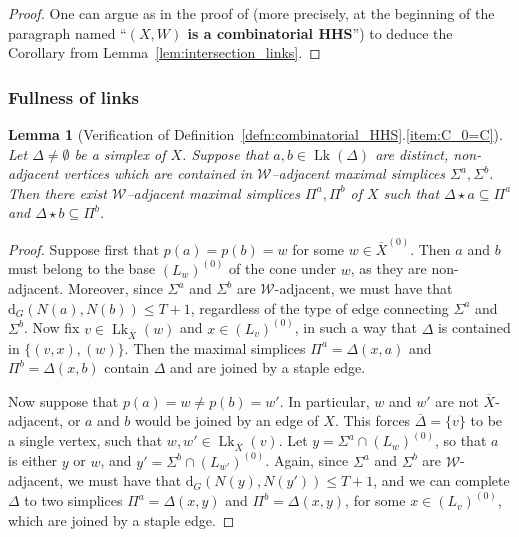 \documentclass[svgnames]{amsart}
\theoremstyle{plain}
\newtheorem{lemma}[thm]{Lemma}
\theoremstyle{definition}
\newcommand{\ov}[1]{\overline{#1}}
\newcommand{\dist}{\mathrm{d}}
\newcommand{\link}{\operatorname{Lk}}
\newcommand{\W}{\mathcal{W}}
\begin{document}
\begin{proof} 
One can argue as in the proof of \cite[Theorem 6.4]{BHMS} (more precisely, at the beginning of the paragraph named “\textbf{$(X,W)$ is a combinatorial HHS}”) to deduce the Corollary from Lemma~\ref{lem:intersection_links}.
\end{proof}






\subsubsection{Fullness of links}
\begin{lemma}[Verification of Definition~\ref{defn:combinatorial_HHS}.\eqref{item:C_0=C}]\label{lem:edges_in_link}
Let $\Delta\neq \emptyset$ be a simplex of $X$. Suppose that $a,b\in\link(\Delta)$ are distinct, non-adjacent vertices which are contained in $\W$--adjacent maximal simplices $\Sigma^a,\Sigma^b$. Then there exist $\W$--adjacent maximal simplices $\Pi^a,\Pi^b$ of $X$ such that $\Delta\star a\subseteq\Pi^a$ and $\Delta\star b\subseteq\Pi^b$.
\end{lemma}

\begin{proof}
    Suppose first that $p(a)=p(b)=w$ for some $w\in\ov{X}^{(0)}$. Then $a$ and $b$ must belong to the base $(L_w)^{(0)}$ of the cone under $w$, as they are non-adjacent. Moreover, since $\Sigma^a$ and $\Sigma^b$ are $\W$-adjacent, we must have that $\dist_{G}\left(N(a),N(b)\right)\le T+1$, regardless of the type of edge connecting $\Sigma^a$ and $\Sigma^b$. Now fix $v\in \link_{\ov X}(w)$ and $x\in (L_v)^{(0)}$, in such a way that $\Delta$ is contained in $\{(v,x),(w)\}$. Then the maximal simplices $\Pi^a=\Delta(x,a)$ and $\Pi^b=\Delta(x,b)$ contain $\Delta$ and are joined by a staple edge.
\par\medskip
    Now suppose that $p(a)=w\neq p(b)=w'$. In particular, $w$ and $w'$ are not $\ov{X}$-adjacent, or $a$ and $b$ would be joined by an edge of $X$. This forces $\ov\Delta=\{v\}$ to be a single vertex, such that $w,w'\in\link_{\ov X}(v)$. Let $y=\Sigma^a\cap (L_w)^{(0)}$, so that $a$ is either $y$ or $w$, and $y'=\Sigma^b\cap (L_{w'})^{(0)}$. Again, since $\Sigma^a$ and $\Sigma^b$ are $\W$-adjacent, we must have that $\dist_{G}\left(N(y),N(y')\right)\le T+1$, and we can complete $\Delta$ to two simplices $\Pi^a=\Delta(x,y)$ and $\Pi^b=\Delta(x,y)$, for some $x\in (L_v)^{(0)}$, which are joined by a staple edge.
\end{proof}
\end{document}
